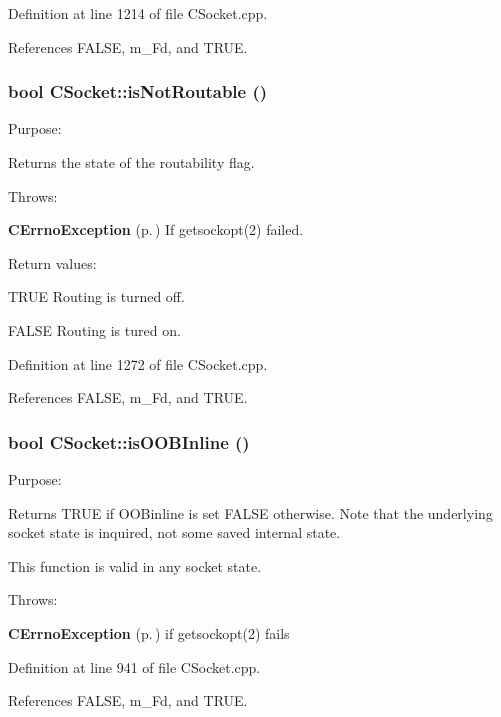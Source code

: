 Definition at line 1214 of file CSocket.cpp.

References FALSE, m\_\-Fd, and TRUE.
\subsubsection{\setlength{\rightskip}{0pt plus 5cm}bool CSocket::is\-Not\-Routable ()}\label{classCSocket_a27}


Purpose:

Returns the state of the routability flag.

Throws:\begin{CompactItemize}
\item 
{\bf CErrno\-Exception} {\rm (p.\,\pageref{classCErrnoException})} If getsockopt(2) failed.\end{CompactItemize}
Return values:\begin{CompactItemize}
\item 
TRUE Routing is turned off.\item 
FALSE Routing is tured on. \end{CompactItemize}


Definition at line 1272 of file CSocket.cpp.

References FALSE, m\_\-Fd, and TRUE.
\subsubsection{\setlength{\rightskip}{0pt plus 5cm}bool CSocket::is\-OOBInline ()}\label{classCSocket_a15}


Purpose:

Returns TRUE if OOBinline is set FALSE otherwise. Note that the underlying socket state is inquired, not some saved internal state.

This function is valid in any socket state.

Throws:\begin{CompactItemize}
\item 
{\bf CErrno\-Exception} {\rm (p.\,\pageref{classCErrnoException})} if getsockopt(2) fails\end{CompactItemize}
 

Definition at line 941 of file CSocket.cpp.

References FALSE, m\_\-Fd, and TRUE.
